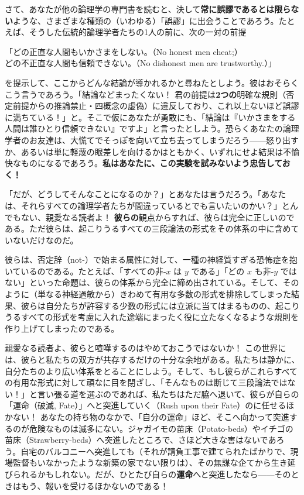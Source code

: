 \documentclass[a4paper,11pt,openany]{ltjsbook}
\begin{document}
さて、あなたが他の論理学の専門書を読むと、決して\textbf{常に誤謬であるとは限らない}ような、さまざまな種類の（いわゆる）「誤謬」に出会うことであろう。たとえば、そうした伝統的論理学者たちの1人の前に、次の一対の前提
\begin{center}
「どの正直な人間もいかさまをしない。（No honest men cheat;）\\
どの不正直な人間も信頼できない。（No dishonest men are trustworthy.）」
\end{center}
を提示して、ここからどんな結論が導かれるかと尋ねたとしよう。彼はおそらくこう言うであろう。「結論などまったくない！ 君の前提は\textbf{2つの}明確な規則（否定前提からの推論禁止・四概念の虚偽）に違反しており、これ以上ないほど誤謬に満ちている！」と。そこで仮にあなたが勇敢にも、「結論は『いかさまをする人間は誰ひとり信頼できない』ですよ」と言ったとしよう。恐らくあなたの論理学者のお友達は、大慌てでそっぽを向いて立ち去ってしまうだろう——怒り出すか、あるいは単に軽蔑の眼差しを向けるかはともかく、いずれにせよ結果は不愉快なものになるであろう。\textbf{私はあなたに、この実験を試みないよう忠告しておく！}

「だが、どうしてそんなことになるのか？」とあなたは言うだろう。「あなたは、それらすべての論理学者たちが間違っているとでも言いたいのかい？」とんでもない、親愛なる読者よ！ \textbf{彼らの}観点からすれば、彼らは完全に正しいのである。ただ彼らは、起こりうるすべての三段論法の形式をその体系の中に含めていないだけなのだ。

彼らは、否定辞（not-）で始まる属性に対して、一種の神経質すぎる恐怖症を抱いているのである。たとえば、「すべての非-$x$ は $y$ である」「どの $x$ も非-$y$ ではない」といった命題は、彼らの体系から完全に締め出されている。そして、そのように（単なる神経過敏から）きわめて有用な多数の形式を排除してしまった結果、彼らは自分たちが許容する少数の形式には立派に当てはまるものの、起こりうるすべての形式を考慮に入れた途端にまったく役に立たなくなるような規則を作り上げてしまったのである。

親愛なる読者よ、彼らと喧嘩するのはやめておこうではないか！ この世界には、彼らと私たちの双方が共存するだけの十分な余地がある。私たちは静かに、自分たちのより広い体系をとることにしよう。そして、もし彼らがこれらすべての有用な形式に対して頑なに目を閉ざし、「そんなものは断じて三段論法ではない！」と言い張る道を選ぶのであれば、私たちはただ脇へ退いて、彼らが自らの「運命（破滅, Fate）」へと突進していく（Rush upon their Fate）のに任せるほかない！ あなたの持ち物のなかで、「自分の運命」ほど、そこへ向かって突進するのが危険なものは滅多にない。ジャガイモの苗床（Potato-beds）やイチゴの苗床（Strawberry-beds）へ突進したところで、さほど大きな害はないであろう。自宅のバルコニーへ突進しても（それが請負工事で建てられたばかりで、現場監督もいなかったような新築の家でない限りは）、その無謀な企てから生き延びられるかもしれない。だが、ひとたび自らの\textbf{運命}へと突進したなら——そのときはもう、報いを受けるほかないのである！
\end{document}

